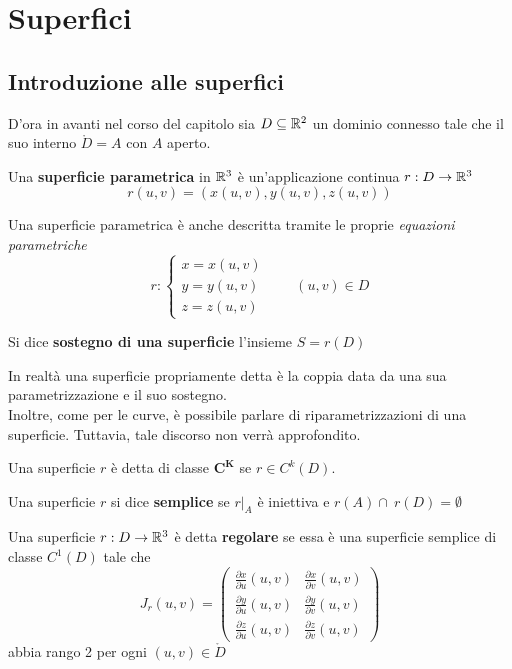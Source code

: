 \chapter{Superfici}
\section{Introduzione alle superfici}
D'ora in avanti nel corso del capitolo sia $D \subseteq \mathbb{R}^2$ un dominio connesso tale che il suo interno $\mathring{D}=A$ con $A$ aperto.
\begin{definition} \label{Def: Superficie parametrica}
    Una \textbf{superficie parametrica} in $\mathbb{R}^3$ è un'applicazione continua $r: D \to \mathbb{R}^3$
    \begin{equation}
        r(u,v)=(x(u,v), y(u,v), z(u,v))
    \end{equation}
\end{definition}
Una superficie parametrica è anche descritta tramite le proprie \textit{equazioni parametriche}
\begin{equation}
    r: \begin{cases}
        x=x(u,v)\\
        y=y(u,v)\\
        z=z(u,v)
    \end{cases}
    \qquad (u,v) \in D
\end{equation}
\begin{definition} \label{Def: Sostegno di una superficie}
    Si dice \textbf{sostegno di una superficie} l'insieme $S=r(D)$
\end{definition}
In realtà una superficie propriamente detta è la coppia data da una sua parametrizzazione e il suo sostegno.\\
Inoltre, come per le curve, è possibile parlare di riparametrizzazioni di una superficie. Tuttavia, tale discorso non verrà approfondito.
\begin{definition} \label{Def: Superficie di classe C^k}
    Una superficie $r$ è detta di classe $\mathbf{C^K}$ se $r \in C^k(D)$.
\end{definition}
\begin{definition} \label{Def: Superficie semplice}
    Una superficie $r$ si dice \textbf{semplice} se $r|_A$ è iniettiva e $r(A) \cap\ r(D)= \emptyset$
\end{definition}
\begin{definition} \label{Def: Superficie regolare}
    Una superficie $r: D \to \mathbb{R}^3$ è detta \textbf{regolare} se essa è una superficie semplice di classe $C^1(D)$ tale che
    \begin{equation}
        J_r(u,v)= \begin{pmatrix}
            \frac{\partial x}{\partial u}(u,v) & \frac{\partial x}{\partial v}(u,v)\\
            \frac{\partial y}{\partial u}(u,v) & \frac{\partial y}{\partial v}(u,v)\\
            \frac{\partial z}{\partial u}(u,v) & \frac{\partial z}{\partial v}(u,v)
        \end{pmatrix}
    \end{equation}
abbia rango 2 per ogni $(u,v) \in \mathring{D}$
\end{definition}
